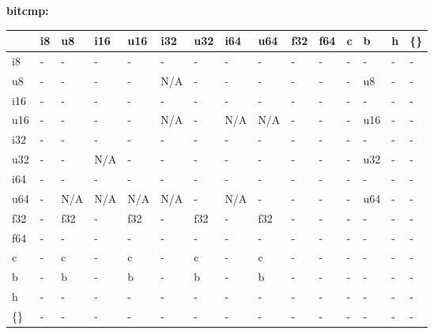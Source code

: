 \textbf{bitcmp:}
\begin{scriptsize}\begin{tt}\begin{center}\vspace{-.3cm}\begin{tabular}{|m{.65cm}||m{.65cm}|m{.65cm}|m{.65cm}|m{.65cm}|m{.65cm}|m{.65cm}|m{.65cm}|m{.65cm}|m{.65cm}|m{.65cm}|m{.65cm}|m{.65cm}|m{.65cm}|m{.65cm}|}\hline 
&i8&u8&i16&u16&i32&u32&i64&u64&f32&f64&c&b&h&\{\}\\ \hline \hline
i8&-&-&-&-&-&-&-&-&-&-&-&-&-&-\\ \hline
u8&-&-&-&-&N/A&-&-&-&-&-&-&u8&-&-\\ \hline
i16&-&-&-&-&-&-&-&-&-&-&-&-&-&-\\ \hline
u16&-&-&-&-&N/A&-&N/A&N/A&-&-&-&u16&-&-\\ \hline
i32&-&-&-&-&-&-&-&-&-&-&-&-&-&-\\ \hline
u32&-&-&N/A&-&-&-&-&-&-&-&-&u32&-&-\\ \hline
i64&-&-&-&-&-&-&-&-&-&-&-&-&-&-\\ \hline
u64&-&N/A&N/A&N/A&N/A&-&N/A&-&-&-&-&u64&-&-\\ \hline
f32&-&f32&-&f32&-&f32&-&f32&-&-&-&-&-&-\\ \hline
f64&-&-&-&-&-&-&-&-&-&-&-&-&-&-\\ \hline
c&-&c&-&c&-&c&-&c&-&-&-&-&-&-\\ \hline
b&-&b&-&b&-&b&-&b&-&-&-&-&-&-\\ \hline
h&-&-&-&-&-&-&-&-&-&-&-&-&-&-\\ \hline
\{\}&-&-&-&-&-&-&-&-&-&-&-&-&-&-\\ \hline
\end{tabular}\end{center}\end{tt}\end{scriptsize} 

